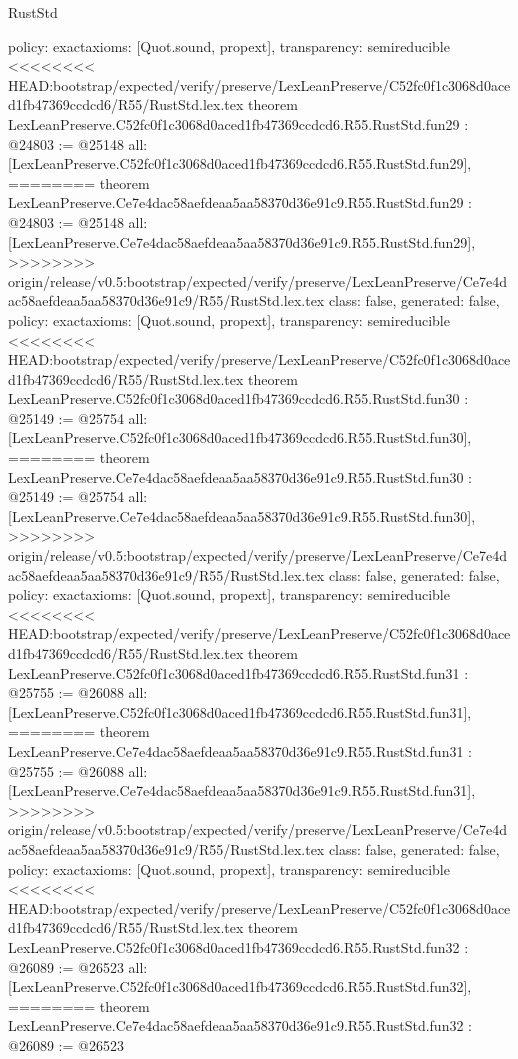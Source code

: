 \begin{lexlean}{RustStd}
\begin{coremodule}
{\begin{coremodule}
{{{{{{{{{{{{{{{{{{{{{{{{{{{{{{{{  policy: exact{axioms: [Quot.sound, propext]},
  transparency: semireducible
}
<<<<<<<< HEAD:bootstrap/expected/verify/preserve/LexLeanPreserve/C52fc0f1c3068d0aced1fb47369ccdcd6/R55/RustStd.lex.tex
theorem LexLeanPreserve.C52fc0f1c3068d0aced1fb47369ccdcd6.R55.RustStd.fun29 : @24803 := @25148 {
  all: [LexLeanPreserve.C52fc0f1c3068d0aced1fb47369ccdcd6.R55.RustStd.fun29],
========
theorem LexLeanPreserve.Ce7e4dac58aefdeaa5aa58370d36e91c9.R55.RustStd.fun29 : @24803 := @25148 {
  all: [LexLeanPreserve.Ce7e4dac58aefdeaa5aa58370d36e91c9.R55.RustStd.fun29],
>>>>>>>> origin/release/v0.5:bootstrap/expected/verify/preserve/LexLeanPreserve/Ce7e4dac58aefdeaa5aa58370d36e91c9/R55/RustStd.lex.tex
  class: false,
  generated: false,
  policy: exact{axioms: [Quot.sound, propext]},
  transparency: semireducible
}
<<<<<<<< HEAD:bootstrap/expected/verify/preserve/LexLeanPreserve/C52fc0f1c3068d0aced1fb47369ccdcd6/R55/RustStd.lex.tex
theorem LexLeanPreserve.C52fc0f1c3068d0aced1fb47369ccdcd6.R55.RustStd.fun30 : @25149 := @25754 {
  all: [LexLeanPreserve.C52fc0f1c3068d0aced1fb47369ccdcd6.R55.RustStd.fun30],
========
theorem LexLeanPreserve.Ce7e4dac58aefdeaa5aa58370d36e91c9.R55.RustStd.fun30 : @25149 := @25754 {
  all: [LexLeanPreserve.Ce7e4dac58aefdeaa5aa58370d36e91c9.R55.RustStd.fun30],
>>>>>>>> origin/release/v0.5:bootstrap/expected/verify/preserve/LexLeanPreserve/Ce7e4dac58aefdeaa5aa58370d36e91c9/R55/RustStd.lex.tex
  class: false,
  generated: false,
  policy: exact{axioms: [Quot.sound, propext]},
  transparency: semireducible
}
<<<<<<<< HEAD:bootstrap/expected/verify/preserve/LexLeanPreserve/C52fc0f1c3068d0aced1fb47369ccdcd6/R55/RustStd.lex.tex
theorem LexLeanPreserve.C52fc0f1c3068d0aced1fb47369ccdcd6.R55.RustStd.fun31 : @25755 := @26088 {
  all: [LexLeanPreserve.C52fc0f1c3068d0aced1fb47369ccdcd6.R55.RustStd.fun31],
========
theorem LexLeanPreserve.Ce7e4dac58aefdeaa5aa58370d36e91c9.R55.RustStd.fun31 : @25755 := @26088 {
  all: [LexLeanPreserve.Ce7e4dac58aefdeaa5aa58370d36e91c9.R55.RustStd.fun31],
>>>>>>>> origin/release/v0.5:bootstrap/expected/verify/preserve/LexLeanPreserve/Ce7e4dac58aefdeaa5aa58370d36e91c9/R55/RustStd.lex.tex
  class: false,
  generated: false,
  policy: exact{axioms: [Quot.sound, propext]},
  transparency: semireducible
}
<<<<<<<< HEAD:bootstrap/expected/verify/preserve/LexLeanPreserve/C52fc0f1c3068d0aced1fb47369ccdcd6/R55/RustStd.lex.tex
theorem LexLeanPreserve.C52fc0f1c3068d0aced1fb47369ccdcd6.R55.RustStd.fun32 : @26089 := @26523 {
  all: [LexLeanPreserve.C52fc0f1c3068d0aced1fb47369ccdcd6.R55.RustStd.fun32],
========
theorem LexLeanPreserve.Ce7e4dac58aefdeaa5aa58370d36e91c9.R55.RustStd.fun32 : @26089 := @26523 {
}}}}}}}}}}}}}}}}}}}}}}}}}}}}}}}}}}}}
\end{coremodule}}
\end{coremodule}
\end{lexlean}
